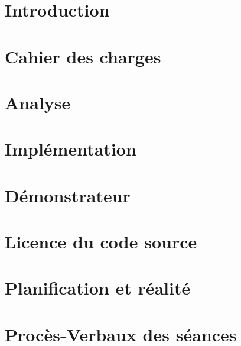\documentclass[
    reds, %
    ie, %
]{heig-tb}
\begin{document}
\maketitle
\frontmatter
\clearemptydoublepage

\preamble
\authentification

\begin{abstract}
    
\end{abstract}

\clearemptydoublepage
{
    \tableofcontents
    \let\cleardoublepage\clearpage
    \listoffigures
    \let\cleardoublepage\clearpage
    \listoftables
    \let\cleardoublepage\clearpage
    \listoflistings
}

\printnomenclature
\clearemptydoublepage
{}

\mainmatter
\chapter{Introduction}

\chapter{Cahier des charges}

\chapter{Analyse}

\chapter{Implémentation}

\chapter{Démonstrateur}


\appendix
\appendixpage
\addappheadtotoc

\chapter{Licence du code source}

\chapter{Planification et réalité}

\chapter{Procès-Verbaux des séances}



\let\cleardoublepage\clearpage
\backmatter
\label{glossaire}
\printnoidxglossary
\printbibliography
\label{index}
\printindex
\end{document}
